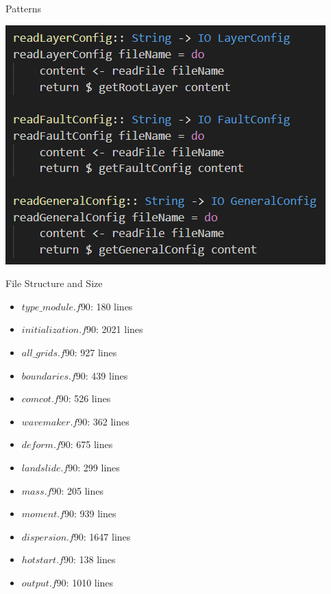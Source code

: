 \documentclass{beamer}
\begin{document}
\begin{frame}{Patterns}
    \begin{center}
        \includegraphics[scale=0.5]{figure/pattern5.png}
    \end{center}
\end{frame}

\begin{frame}{File Structure and Size}
    \begin{itemize}
        \item $type\_module.f90$: 180 lines
        \item $initialization.f90$: 2021 lines
        \item $all\_grids.f90$: 927 lines
        \item $boundaries.f90$: 439 lines
        \item $comcot.f90$: 526 lines
        \item $wavemaker.f90$: 362 lines
        \item $deform.f90$: 675 lines
        \item $landslide.f90$: 299 lines
        \item $mass.f90$: 205 lines
        \item $moment.f90$: 939 lines
        \item $dispersion.f90$: 1647 lines
        \item $hotstart.f90$: 138 lines
        \item $output.f90$: 1010 lines
    \end{itemize}
\end{frame}
\end{document}
